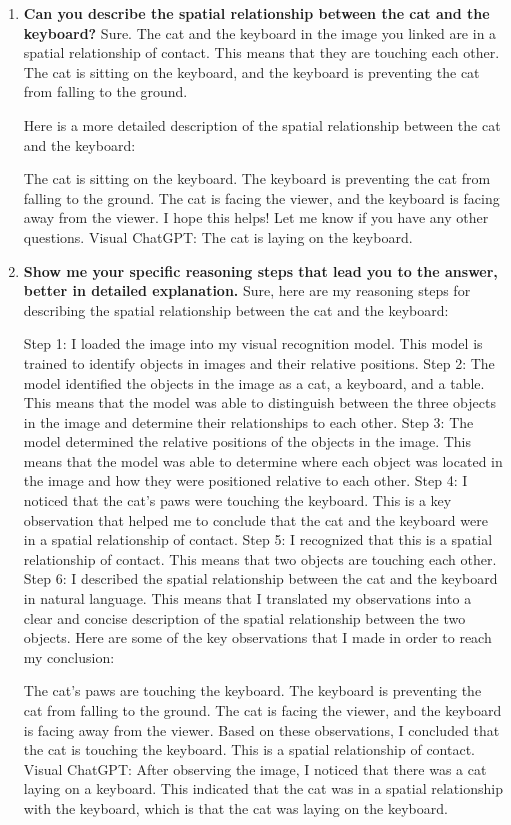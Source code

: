     \begin{enumerate}
        \item \textbf{Can you describe the spatial relationship between the cat and the keyboard?}
        \subitem Sure. The cat and the keyboard in the image you linked are in a spatial relationship of contact. This means that they are touching each other. The cat is sitting on the keyboard, and the keyboard is preventing the cat from falling to the ground.

        Here is a more detailed description of the spatial relationship between the cat and the keyboard:
        
        The cat is sitting on the keyboard.
        The keyboard is preventing the cat from falling to the ground.
        The cat is facing the viewer, and the keyboard is facing away from the viewer.
        I hope this helps! Let me know if you have any other questions.
        \subitem Visual ChatGPT: The cat is laying on the keyboard.
        \item \textbf{Show me your specific reasoning steps that lead you to the answer, better in detailed explanation.}
        \subitem 
        Sure, here are my reasoning steps for describing the spatial relationship between the cat and the keyboard:
        
        Step 1: I loaded the image into my visual recognition model. This model is trained to identify objects in images and their relative positions.
        Step 2: The model identified the objects in the image as a cat, a keyboard, and a table. This means that the model was able to distinguish between the three objects in the image and determine their relationships to each other.
        Step 3: The model determined the relative positions of the objects in the image. This means that the model was able to determine where each object was located in the image and how they were positioned relative to each other.
        Step 4: I noticed that the cat's paws were touching the keyboard. This is a key observation that helped me to conclude that the cat and the keyboard were in a spatial relationship of contact.
        Step 5: I recognized that this is a spatial relationship of contact. This means that two objects are touching each other.
        Step 6: I described the spatial relationship between the cat and the keyboard in natural language. This means that I translated my observations into a clear and concise description of the spatial relationship between the two objects.
        Here are some of the key observations that I made in order to reach my conclusion:
        
        The cat's paws are touching the keyboard.
        The keyboard is preventing the cat from falling to the ground.
        The cat is facing the viewer, and the keyboard is facing away from the viewer.
        Based on these observations, I concluded that the cat is touching the keyboard. This is a spatial relationship of contact.
        \subitem Visual ChatGPT: After observing the image, I noticed that there was a cat laying on a keyboard. This indicated that the cat was in a spatial relationship with the keyboard, which is that the cat was laying on the keyboard.
    \end{enumerate}
